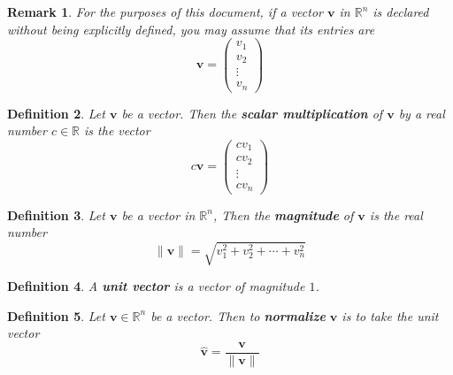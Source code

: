 \documentclass[12pt]{book}
\newcommand{\rbb}{\mathbb{R}}
\newcommand{\rbbn}{\mathbb{R}^n}
\theoremstyle{definitionstyle}
\newtheorem{definition}{Definition}[section]
\newtheorem{remark}[definition]{Remark}
\numberwithin{equation}{section}
\begin{document}
\begin{remark}
    For the purposes of this document, if a vector $\mathbf{v}$ in $\rbbn$ is declared without being explicitly defined, you may assume that its entries are
    $$ \mathbf{v} = \begin{pmatrix} v_1 \\ v_2 \\ \vdots \\ v_n \end{pmatrix} $$
\end{remark}

\vspace{0.5cm}

\begin{definition}
    Let $\mathbf{v}$ be a vector. Then the \textbf{scalar multiplication} of $\mathbf{v}$ by a real number $c \in \rbb$ is the vector 
    \begin{equation}
	c\mathbf{v} = \begin{pmatrix} cv_1 \\ cv_2 \\ \vdots \\ cv_n \end{pmatrix}
    \end{equation}
\end{definition}

\vspace{0.5cm}

\begin{definition}
	Let $\mathbf{v} $ be a vector in $\rbb^n$, Then the \textbf{magnitude} of $\mathbf{v}$ is the real number
	\begin{equation}
	\|\mathbf{v}\| = \sqrt{v_1^2 + v_2^2 + \cdots + v_n^2}
	\end{equation}
\end{definition}

\newpage

\begin{definition}\label{unit-vector}
    A \textbf{unit vector} is a vector of magnitude $1$.
\end{definition}

\begin{definition}
    Let $\mathbf{v} \in \rbb^n$ be a vector. Then to \textbf{normalize} $\mathbf{v}$ is to take the unit vector 
	\begin{equation}
	    \mathbf{\hat{v}}  = \frac{\mathbf{v}}{\|\mathbf{v}\|}
	\end{equation}
\end{definition}
\end{document}
